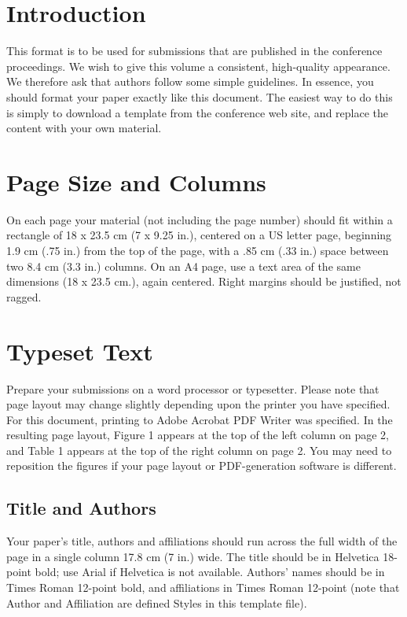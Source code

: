 \documentclass{ubicomp2012}
\begin{document}
\section{Introduction}

This format is to be used for submissions that are published in the
conference proceedings.  We wish to give this volume a consistent,
high-quality appearance. We therefore ask that authors follow some
simple guidelines. In essence, you should format your paper exactly
like this document. The easiest way to do this is simply to download
a template from the conference web site, and replace the content
with your own material.
\section{Page Size and Columns}

On each page your material (not including the page number) should fit
within a rectangle of 18 x 23.5 cm (7 x 9.25 in.), centered on a US
letter page, beginning 1.9 cm (.75 in.) from the top of the page, with
a .85 cm (.33 in.) space between two 8.4 cm (3.3 in.) columns.  On an
A4 page, use a text area of the same dimensions (18 x 23.5 cm.), again
centered.  Right margins should be justified, not ragged.

\section{Typeset Text}

Prepare your submissions on a word processor or typesetter. Please note that page layout may change slightly depending upon the printer you have specified. For this document, printing to Adobe Acrobat PDF Writer was specified. In the resulting page layout, Figure 1 appears at the top of the left column on page 2, and Table 1 appears at the top of the right column on page 2. You may need to reposition the figures if your page layout or PDF-generation software is different.

\subsection{Title and Authors}

Your paper's title, authors and affiliations should run across the
full width of the page in a single column 17.8 cm (7 in.) wide.  The
title should be in Helvetica 18-point bold; use Arial if Helvetica is
not available.  Authors' names should be in Times Roman 12-point bold,
and affiliations in Times Roman 12-point (note that Author and
Affiliation are defined Styles in this template file).
\end{document}

